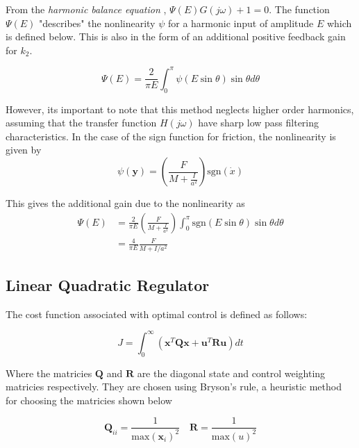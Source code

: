 \documentclass{article}
\begin{document}
From the \textit{harmonic balance equation} \cite{non_linear_systems}, $\Psi(E)G(j\omega) + 1 = 0$.
The function $\Psi(E)$ "describes" the nonlinearity $\psi$ for a harmonic input of amplitude $E$ which is defined below.
This is also in the form of an additional positive feedback gain for $k_2$.

\begin{equation}
  \Psi(E) = \frac{2}{\pi E} \int_0^{\pi} \psi(E\sin\theta)\sin\theta d\theta
\end{equation}

However, its important to note that this method neglects higher order harmonics, assuming that the transfer function $H(j\omega)$ have sharp low pass filtering characteristics.
In the case of the sign function for friction, the nonlinearity is given by 
\begin{equation}
  \psi(\mathbf{y}) = \left(\frac{F}{M + \frac{I}{a^2}} \right) \text{sgn}(\dot{x})
\end{equation}

This gives the additional gain due to the nonlinearity as
\begin{align}
  \Psi(E) &= \frac{2}{\pi E} \left(\frac{F}{M + \frac{I}{a^2}} \right) \int_0^{\pi} \text{sgn}(E\sin\theta)\sin\theta d\theta \\
          &= \frac{4}{\pi E} \frac{F}{M + I/{a^2}} \label{eq:additional_k2}
\end{align}


\subsection{Linear Quadratic Regulator}

The cost function associated with optimal control is defined as follows:

\begin{equation}
  J = \int_0^\infty \left( \mathbf{x}^T \mathbf{Q} \mathbf{x} + \mathbf{u}^T \mathbf{R} \mathbf{u} \right) dt
\end{equation}

Where the matricies $\mathbf{Q}$ and $\mathbf{R}$ are the diagonal state and control weighting matricies respectively.
They are chosen using Bryson's rule, a heuristic method for choosing the matricies shown below \cite{feedback_control_of_dynamic_systems}

\begin{equation}
  \mathbf{Q}_{ii} = \frac{1}{\text{max}(\mathbf{x}_i)^2} \quad \mathbf{R} = \frac{1}{\text{max}(u)^2}
\end{equation}
\end{document}
